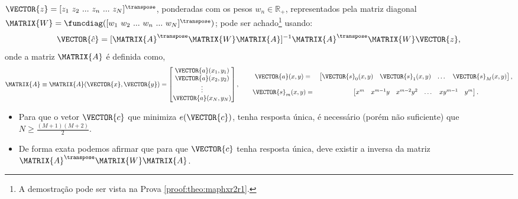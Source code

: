 \begin{theorem}
$\VECTOR{z}=[z_1~ z_2~ ...~ z_n~ ...~ z_N]^{\transpose}$,
ponderadas com os pesos $w_n \in \mathbb{R}_+$, 
representados pela matriz diagonal $\MATRIX{W}=\funcdiag([w_1~ w_2~ ...~ w_n~ ...~ w_N]^{\transpose})$;
pode ser achado\footnote{A demostração pode ser vista na Prova \ref{proof:theo:maphxr2r1}.} usando:
\begin{equation}\label{eq:maphxr2r1:3}
\VECTOR{\hat{c}}=[\MATRIX{A}^{\transpose}\MATRIX{W}\MATRIX{A}]^{-1}\MATRIX{A}^{\transpose}\MATRIX{W}\VECTOR{z},
\end{equation}
onde a matriz $\MATRIX{A}$ é definida como,
\begin{equation}\label{eq:maphxr2r1:4}
\MATRIX{A}\equiv\MATRIX{A}(\VECTOR{x},\VECTOR{y})=\begin{bmatrix}
\VECTOR{a}(x_1,y_1)\\
\VECTOR{a}(x_2,y_2)\\
\vdots\\
\VECTOR{a}(x_N,y_N)\\
\end{bmatrix}, \qquad
\begin{matrix}
\VECTOR{a}(x,y)= &
\begin{bmatrix}
\VECTOR{s}_{0}(x,y) & \VECTOR{s}_{1}(x,y) &  \dots  & \VECTOR{s}_{M}(x,y)
\end{bmatrix},\\
~&~\\
\VECTOR{s}_{m}(x,y)=&
\begin{bmatrix}
x^m  & x^{m-1} y  & x^{m-2} y^2    & \dots  & x y^{m-1} &  y^m 
\end{bmatrix}.
\end{matrix}
\end{equation}
\end{theorem}


\begin{tcbattention}
\begin{itemize}
\item Para que o vetor $\VECTOR{c}$
que minimiza $e(\VECTOR{c})$, tenha resposta única,
é necessário (porém não suficiente) que  $N\geq \frac{(M+1)(M+2)}{2}$.
\item De forma exata podemos afirmar que para que $\VECTOR{c}$ tenha resposta única,
deve existir a inversa da matriz $\MATRIX{A}^{\transpose}\MATRIX{W}\MATRIX{A}$.
\end{itemize}
\end{tcbattention}

